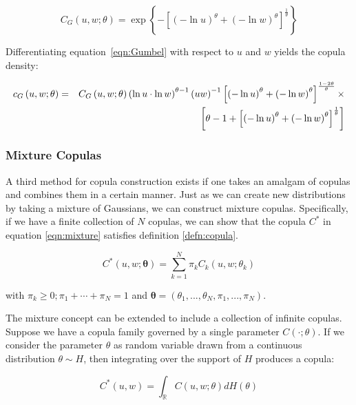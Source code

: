 \begin{equation} \label{eqn:Gumbel}
	C_{G}\left(u,w;\theta\right) = \exp\left\{-\left[\left(-\ln u\right)^{\theta}+\left( -\ln w\right)^{\theta }\right]^{\frac{1}{\theta}}\right\}
\end{equation}

Differentiating equation~\ref{eqn:Gumbel} with respect to $u$ and $w$ yields the copula density:

\begin{eqnarray}
	c_{G}\left(u,w;\theta\right) &=& C_{G}\left(u,w;\theta\right)\left(\ln u\cdot\ln w\right)^{\theta -1}\left(uw\right)^{-1}\left[\left(-\ln u\right)^{\theta}+\left(-\ln w\right)^{\theta}\right]^{\frac{1-2\theta}{\theta}}\times  \notag \\
	&& \left[\theta -1+\left[\left(-\ln u\right)^{\theta}+\left(-\ln w\right)^{\theta}\right]^{\frac{1}{\theta}}\right]
\end{eqnarray}

\subsubsection{Mixture Copulas} \label{sec:mixtureCopula}

A third method for copula construction exists if one takes an amalgam of copulas and combines them in a certain manner. Just as we can create new distributions by taking a mixture of Gaussians, we can construct mixture copulas. Specifically, if we have a finite collection of $N$ copulas, we can show that the copula $C^{\ast}$ in equation \ref{eqn:mixture} satisfies definition \ref{defn:copula}.

\begin{equation} \label{eqn:mixture}
    C^{\ast} \left(u, w; \boldsymbol{\theta} \right) = \sum_{k=1}^{N} \pi_{k} C_{k} \left(u, w; \theta _{k} \right)
\end{equation}

with $\pi _{k} \geq 0; \pi_{1} + \cdots + \pi_{N} = 1$ and $\boldsymbol{\theta} = \left(\theta_{1}, ..., \theta_{N}, \pi_{1}, ..., \pi_{N} \right)$.

The mixture concept can be extended to include a collection of infinite copulas. Suppose we have a copula family governed by a single parameter $C\left(\cdot;\theta\right)$. If we consider the parameter $\theta$ as random variable drawn from a continuous distribution $\theta\sim H$, then integrating over the support of $H$ produces a copula:

\begin{equation}
	C^{\ast}\left( u,w\right) =\int_{\mathbb{R}}C\left(u,w;\theta\right)dH\left(\theta\right)
\end{equation}

